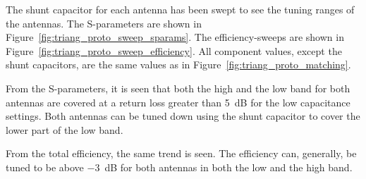 The shunt capacitor for each antenna has been swept to see the tuning ranges of the antennas. The S-parameters are shown in Figure~\ref{fig:triang_proto_sweep_sparams}. The efficiency-sweeps are shown in Figure~\ref{fig:triang_proto_sweep_efficiency}. All component values, except the shunt capacitors, are the same values as in Figure~\ref{fig:triang_proto_matching}.

From the S-parameters, it is seen that both the high and the low band for both antennas are covered at a return loss greater than \SI{5}{dB} for the low capacitance settings. Both antennas can be tuned down using the shunt capacitor to cover the lower part of the low band.

From the total efficiency, the same trend is seen. The efficiency can, generally, be tuned to be above \SI{-3}{dB} for both antennas in both the low and the high band.

